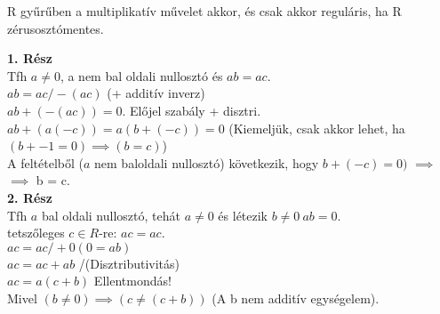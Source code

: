 \begin{frame}
\begin{tcolorbox}[title={Lemma: Nullosztó és regularitás}]
R gyűrűben a multiplikatív művelet akkor, és csak akkor reguláris, ha R zérusosztómentes.
\end{tcolorbox}

\begin{tcolorbox}[title={Bizonyítás}]
\textbf{1. Rész}\\
Tfh $a \neq 0$, a nem bal oldali nullosztó és $ab = ac$.\\
$ab = ac  / -(ac)$ (+ additív inverz)\\
$ab + (-(ac)) = 0$. Előjel szabály + disztri.\\
$ab + (a(-c)) = a(b+(-c)) = 0$ (Kiemeljük, csak akkor lehet, ha $(b + -1 = 0) \implies (b = c)$)\\
A feltételből ($a$ nem baloldali nullosztó) következik, hogy $b + (-c) = 0)$ $\implies$\\
$\implies$ b = c.\\
\bigskip
\textbf{2. Rész}\\
Tfh $a$ bal oldali nullosztó, tehát $a \neq 0$ és létezik $b \neq 0\: ab = 0$.\\
tetszőleges $c \in R$-re: $ac = ac$.\\
$ac = ac / +0 (0 = ab)$\\
$ac = ac + ab$ /(Disztributivitás)\\
$ac = a(c + b)$ Ellentmondás!\\
Mivel $(b \neq 0) \implies (c \neq (c + b))$ (A b nem additív egységelem).
\end{tcolorbox}
\end{frame}

\begin{frame}

\begin{tcolorbox}[title={Def.: Rendezett Integritási Tartomány}]
\end{tcolorbox}

\begin{tcolorbox}[title={Def.: Egységelemes Integritási Tartomány}]
\end{tcolorbox}
\end{frame}



\begin{frame}[plain]
\end{frame}


